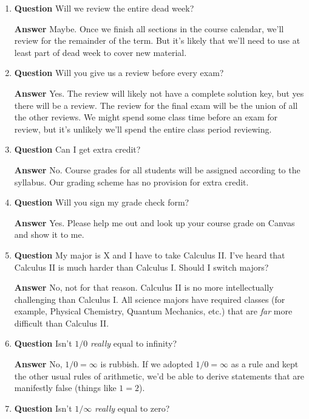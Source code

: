 \documentclass[11pt]{article}
\newcounter{ex}\setcounter{ex}{0}
\begin{document}
\begin{enumerate}
\item  \textbf{Question}  Will  we review the entire dead week?

\textbf{Answer} Maybe.  Once we finish all sections in the course 
calendar, we'll review for the remainder of the term.  But it's 
likely that we'll need to use at least part of dead week to cover
new material. 


\item  \textbf{Question}  Will you give us a review before every exam?

\textbf{Answer} Yes. The review will likely not have a complete solution key, 
but yes there will be a review. The review for the final exam will be the union 
of all the other reviews.  We might spend some class time before an exam for review, 
but it's unlikely we'll spend the entire class period reviewing. 

\item  \textbf{Question}  Can I get extra credit?

\textbf{Answer} No. Course grades for all students will be
assigned according to the syllabus. Our grading scheme has 
no provision for extra credit. 

\item  \textbf{Question}  Will you sign my grade check form?

\textbf{Answer} Yes.  Please help me out and look up your course grade on Canvas and 
show it to me.

\item  \textbf{Question}  My major is X and I have to take Calculus II.  I've heard 
that Calculus II is much harder than Calculus I.  Should I switch majors?

 \textbf{Answer}  No, not for that reason. Calculus II is no more intellectually 
 challenging than Calculus I. All science majors have required classes 
 (for example, Physical Chemistry, Quantum Mechanics, etc.) that
are \emph{far} more difficult than Calculus II. 

\item  \textbf{Question} Isn't \(1/0\) \emph{really} equal to infinity?

  \textbf{Answer}  No,  \(1/0 = \infty\)  is rubbish. If we adopted   
   \(1/0 = \infty\) as a rule and kept the other usual rules of arithmetic, we'd 
   be able to derive statements that
are manifestly false (things like \(1 = 2\)).


\item  \textbf{Question} Isn't \(1/\infty \) \emph{really} equal to zero?


\end{enumerate}
\end{document}
